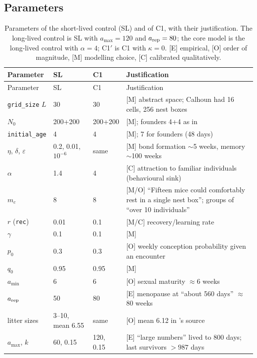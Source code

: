 \documentclass[preprint,12pt,authoryear]{elsarticle}
\begin{document}
\subsection*{Parameters}
{\small
\begin{longtable}{@{}p{}p{}p{}p{}@{}}
\caption{Parameters of the short-lived control (SL) and of \textsf{C1}, with their justification. The long-lived
control is SL with $a_{\max}=120$ and $a_{\rm rep}=80$; the core model is the long-lived control with $\alpha=4$;
\textsf{C1}$'$ is \textsf{C1} with $\kappa=0$. [E] empirical, [O] order of magnitude, [M] modelling choice,
[C] calibrated qualitatively.}\label{tab:odd-params}\\
\toprule
Parameter & SL & \textsf{C1} & Justification \\
\midrule
\endfirsthead
\toprule
Parameter & SL & \textsf{C1} & Justification \\
\midrule
\endhead
\bottomrule
\endfoot
\texttt{grid\_size} $L$ & 30 & 30 & [M] abstract space; Calhoun had 16 cells, 256 nest boxes \\
$N_0$ & 200+200 & 200+200 & [M]; founders 4+4 as in \citep{Calhoun1973} \\
\texttt{initial\_age} & 4 & 4 & [M]; 7 for founders (48 days) \\
$\eta$, $\delta$, $\varepsilon$ & 0.2, 0.01, $10^{-6}$ & same & [M] bond formation $\sim$5 weeks, memory $\sim$100 weeks \\
$\alpha$ & 1.4 & 4 & [C] attraction to familiar individuals (behavioural sink) \\
$m_c$ & 8 & 8 & [M/O] ``Fifteen mice could comfortably rest in a single nest box''; groups of ``over 10 individuals'' \citep{Calhoun1973} \\
$r$ (\texttt{rec}) & 0.01 & 0.1 & [M/C] recovery/learning rate \\
$\gamma$ & 0.1 & 0.1 & [M] \\
$p_0$ & 0.3 & 0.3 & [O] weekly conception probability given an encounter \\
$q_0$ & 0.95 & 0.95 & [M] \\
$a_{\min}$ & 6 & 6 & [O] sexual maturity $\approx$6 weeks \\
$a_{\rm rep}$ & 50 & 80 & [E] menopause at ``about 560 days'' $\approx$80 weeks \citep{Calhoun1973} \\
litter sizes & 3--10, mean 6.55 & same & [O] mean 6.12 in \citep{GwizdallaDus2026}'s source \\
$a_{\max}$, $k$ & 60, 0.15 & 120, 0.15 & [E] ``large numbers'' lived to 800 days; last survivors $>987$ days \citep{Calhoun1973} \\

\end{longtable}}
\end{document}
